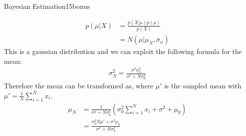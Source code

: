\begin{questions}
\begin{question}{Bayesian Estimation}{15}{bonus}
\begin{answer}
\begin{align*}
p(\mu|X) &= \frac{p(X|\mu)p(\mu)}{p(X)} \\
&= N(\mu|\mu_N,\sigma_n)
\end{align*}
This is a gaussian distribution and we can exploit the following formula for the mean:
\begin{align*}
\sigma_N^2=\frac{\sigma^2\sigma_0^2}{\sigma^2+N\sigma_0^2}
\end{align*}
Therefore the mean can be transformed as, where $\mu'$ is the sampled mean with $\mu'=\frac{1}{N}\sum_{i=1}^{N}x_i$.
\begin{align*}
\mu_N &= \frac{1}{\sigma^2+N\sigma_0^2}(\sigma_0^2 \sum_{i=1}^{N}x_i+\sigma^2+\mu_0) \\
&= \frac{\sigma_0^2N\mu' + \sigma^2\mu_0}{\sigma^2+N\sigma_0^2}
\end{align*}


\end{answer}

\end{question}

\end{questions}

